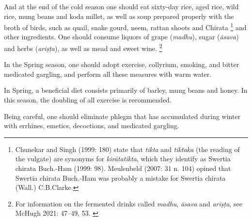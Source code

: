 \begin{translation}
	\item[41--42]

	And at the end of the cold season one should eat sixty-day rice, aged rice, %
	wild rice, mung beans and koda millet, as well as soup prepared properly %
	with the broth of birds, such as quail, %
	snake gourd, neem, rattan shoots %
	and Chirata%
	\footnote{Chunekar and Singh (1999: 180) state that \emph{tikta} and \emph{tiktaka} (the reading of the vulgate) are synonyms for \emph{kirātatikta}, which they identify as Swertia chirata Buch.-Ham (1999: 98). Meulenbeld (2007: 31 n. 104) opined that Swertia chirata Buch.-Ham was probably a mistake for Swertia chirata (Wall.) C.B.Clarke.}
	and other ingredients. %
	One should consume liquors of grape (\emph{madhu}), sugar (\emph{āsava}) and herbs (\emph{ariṣṭa}), as well as mead and sweet wine.%
	\footnote{For information on the fermented drinks called \emph{madhu}, \emph{āsava} and \emph{ariṣṭa}, see McHugh 2021: 47–49, 53. \label{liquors}}

	\item[43]
	In the Spring season,%
	one should adopt exercise, collyrium, smoking, and bitter medicated gargling, %
	and perform all these measures with warm water.

	\item[44]
	In Spring, a beneficial diet consists primarily of barley, mung beans and honey. In this season, the doubling of all exercise is recommended.

	\item[45]
	Being careful, one should eliminate phlegm that has accumulated during winter with errhines, %
	emetics, decoctions, and medicated gargling.


\end{translation}
